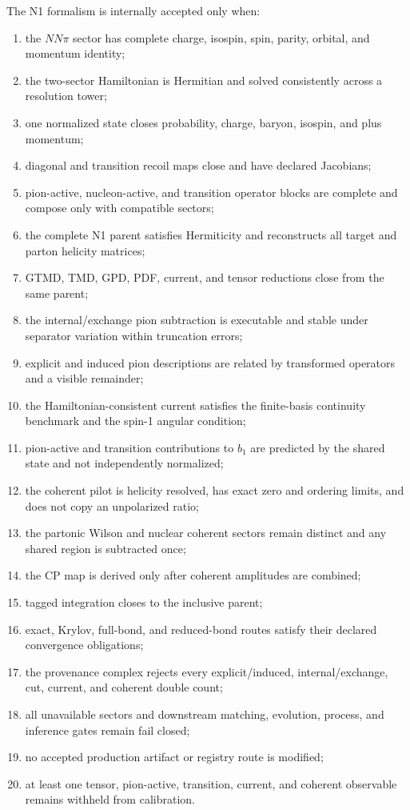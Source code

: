 \documentclass[11pt]{article}
\begin{document}
The N1 formalism is internally accepted only when:
\begin{enumerate}
\item the \(NN\pi\) sector has complete charge, isospin, spin, parity, orbital,
and momentum identity;
\item the two-sector Hamiltonian is Hermitian and solved consistently across a
resolution tower;
\item one normalized state closes probability, charge, baryon, isospin, and
plus momentum;
\item diagonal and transition recoil maps close and have declared Jacobians;
\item pion-active, nucleon-active, and transition operator blocks are complete
and compose only with compatible sectors;
\item the complete N1 parent satisfies Hermiticity and reconstructs all target
and parton helicity matrices;
\item GTMD, TMD, GPD, PDF, current, and tensor reductions close from the same
parent;
\item the internal/exchange pion subtraction is executable and stable under
separator variation within truncation errors;
\item explicit and induced pion descriptions are related by transformed
operators and a visible remainder;
\item the Hamiltonian-consistent current satisfies the finite-basis continuity
benchmark and the spin-1 angular condition;
\item pion-active and transition contributions to \(b_1\) are predicted by the
shared state and not independently normalized;
\item the coherent pilot is helicity resolved, has exact zero and ordering
limits, and does not copy an unpolarized ratio;
\item the partonic Wilson and nuclear coherent sectors remain distinct and any
shared region is subtracted once;
\item the CP map is derived only after coherent amplitudes are combined;
\item tagged integration closes to the inclusive parent;
\item exact, Krylov, full-bond, and reduced-bond routes satisfy their declared
convergence obligations;
\item the provenance complex rejects every explicit/induced, internal/exchange,
cut, current, and coherent double count;
\item all unavailable sectors and downstream matching, evolution, process, and
inference gates remain fail closed;
\item no accepted production artifact or registry route is modified;
\item at least one tensor, pion-active, transition, current, and coherent
observable remains withheld from calibration.
\end{enumerate}
\end{document}
